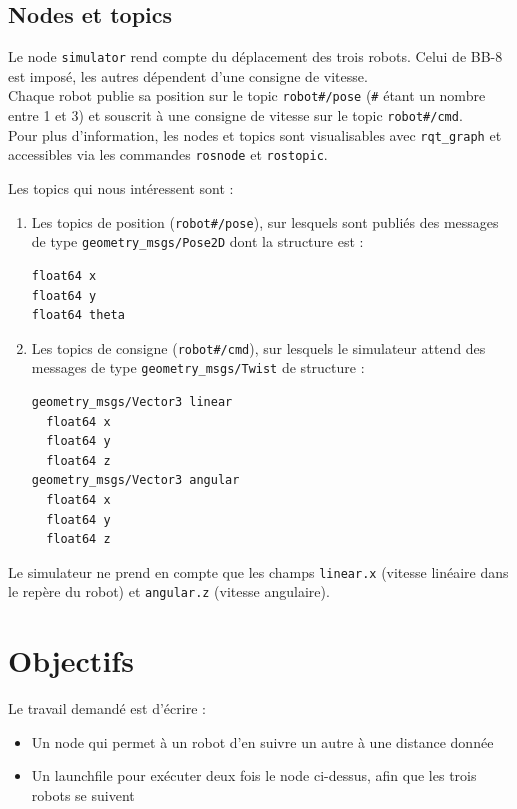 \documentclass{ecnreport}
\begin{document}
\subsection{Nodes et topics}

Le node \texttt{simulator} rend compte du déplacement des trois robots. Celui de BB-8 est imposé, les autres dépendent d'une consigne de vitesse.\\
Chaque robot publie sa position sur le topic \texttt{robot\#/pose} (\texttt{\#} étant un nombre entre 1 et 3) et souscrit à une consigne de vitesse sur le topic \texttt{robot\#/cmd}.\\
Pour plus d'information, les nodes et topics sont visualisables avec \texttt{rqt\_graph} et accessibles via les commandes \texttt{rosnode} et \texttt{rostopic}.

Les topics qui nous intéressent sont :
\begin{enumerate}
 \item Les topics de position (\texttt{robot\#/pose}), sur lesquels sont publiés des messages de type \texttt{geometry\_msgs/Pose2D} dont la structure est :
 \begin{center}
\begin{lstlisting}
float64 x
float64 y
float64 theta
\end{lstlisting}
\end{center}
\item Les topics de consigne (\texttt{robot\#/cmd}), sur lesquels le simulateur attend des messages de type \texttt{geometry\_msgs/Twist} de structure : 
 \begin{center}
\begin{lstlisting}
geometry_msgs/Vector3 linear
  float64 x
  float64 y
  float64 z
geometry_msgs/Vector3 angular
  float64 x
  float64 y
  float64 z
\end{lstlisting}
\end{center}
\end{enumerate}

Le simulateur ne prend en compte que les champs \texttt{linear.x} (vitesse linéaire dans le repère du robot) et \texttt{angular.z} (vitesse angulaire).

\section{Objectifs}

Le travail demandé est d'écrire :
\begin{itemize}
 \item Un node qui permet à un robot d'en suivre un autre à une distance donnée
 \item Un launchfile pour exécuter deux fois le node ci-dessus, afin que les trois robots se suivent
\end{itemize}
\end{document}
